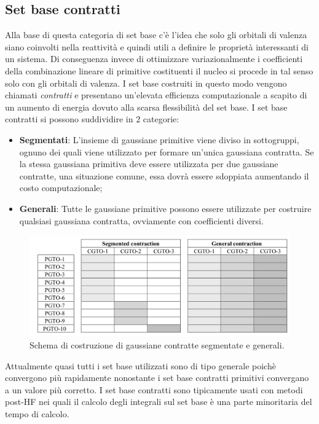 \documentclass[oneside]{amsbook}
\numberwithin{section}{chapter}
\numberwithin{equation}{section}
\numberwithin{figure}{section}
\begin{document}
\subsection{Set base contratti}
Alla base di questa categoria di set base c'è l'idea che solo gli orbitali di valenza siano coinvolti nella reattività e quindi utili a definire le proprietà interessanti di un sistema. Di conseguenza invece di ottimizzare variazionalmente i coefficienti della combinazione lineare di primitive costituenti il nucleo si procede in tal senso solo con gli orbitali di valenza.
I set base costruiti in questo modo vengono chiamati \emph{contratti} e presentano un'elevata efficienza computazionale a scapito di un aumento di energia dovuto alla scarsa flessibilità del set base.
I set base contratti si possono suddividire in $2$ categorie:
\begin{itemize}
\item \textbf{Segmentati}: L'insieme di gaussiane primitive viene diviso in sottogruppi, ognuno dei quali viene utilizzato per formare un'unica gaussiana contratta. Se la stessa gaussiana primitiva deve essere utilizzata per due gaussiane contratte, una situazione comune, essa dovrà essere sdoppiata aumentando il costo computazionale;
\item \textbf{Generali}: Tutte le gaussiane primitive possono essere utilizzate per costruire qualsiasi gaussiana contratta, ovviamente con coefficienti diversi.
\end{itemize}

\begin{figure}[H]
\centering
\caption{Schema di costruzione di gaussiane contratte segmentate e generali.}\label{coz}
\includegraphics[scale=0.3]{segcon}
\end{figure}

Attualmente quasi tutti i set base utilizzati sono di tipo generale poichè convergono più rapidamente nonostante i set base contratti primitivi convergano a un valore più corretto. I set base contratti sono tipicamente usati con metodi post-HF nei quali il calcolo degli integrali sul set base è una parte minoritaria del tempo di calcolo.
\end{document}
